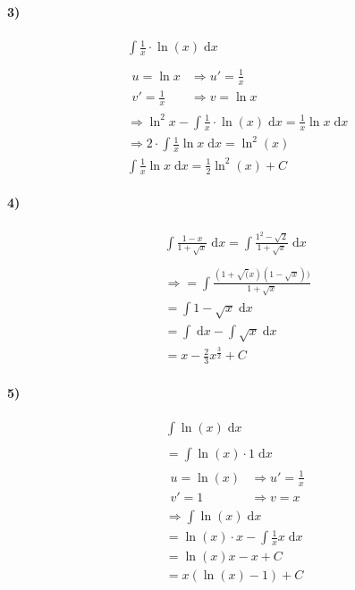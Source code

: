 \paragraph{3)}

\begin{align*}
    &\int \frac{1}{x} \cdot \ln(x) \;\mathrm{d}x \\
    \\
    &\begin{array}{ll}
        u = \ln x &\Rightarrow u'= \frac{1}{x} \\
        v' = \frac{1}{x} &\Rightarrow v = \ln x 
    \end{array} \\
    &\Rightarrow \ln^2 x - \int \frac{1}{x} \cdot \ln(x) \;\mathrm{d}x = \frac{1}{x} \ln x \;\mathrm{d}x \\
    &\Rightarrow 2 \cdot \int \frac{1}{x} \ln x \;\mathrm{d}x = \ln^2(x) \\
    &\int \frac{1}{x} \ln x \;\mathrm{d}x = \frac{1}{2} \ln^2 (x) + C
\end{align*}

\paragraph{4)}

\begin{align*}
    &\int \frac{1-x}{1+\sqrt{x}} \;\mathrm{d}x = \int \frac{1^2 - \sqrt{2}}{1+ \sqrt{x}} \;\mathrm{d}x \\
    \\
    &\Rightarrow = \int \frac{(1 + \sqrt(x) (1 - \sqrt{x}))}{1 + \sqrt{x}} \\
    &= \int 1 - \sqrt{x} \;\mathrm{d}x \\
    &= \int \;\mathrm{d}x - \int \sqrt{x} \;\mathrm{d}x \\
    &= x - \frac{2}{3} x^{\frac{3}{2}} + C     
\end{align*}

\paragraph{5)}

\begin{align*}
    &\int \ln(x) \;\mathrm{d}x \\
    \\
    &= \int \ln(x) \cdot 1 \;\mathrm{d}x \\
    &\begin{array}{ll}
        u = \ln(x) &\Rightarrow u' = \frac{1}{x} \\
        v' = 1 &\Rightarrow v = x
    \end{array} \\
    &\Rightarrow \int \ln(x) \;\mathrm{d}x \\
    &= \ln(x) \cdot x - \int \frac{1}{x} x \;\mathrm{d}x \\
    &= \ln(x) x - x + C \\
    &= x(\ln(x) - 1) + C
\end{align*}

